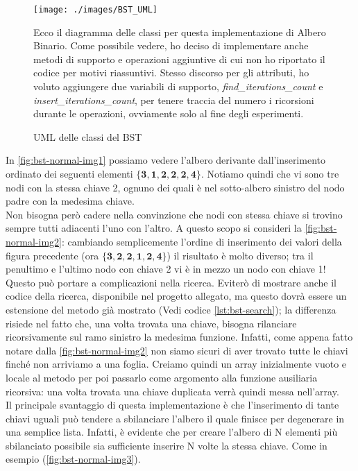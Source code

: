 \documentclass{article}
\begin{document}
\begin{figure}[htbp]
  \begin{minipage}{0.5\textwidth}
    \centering
    \texttt{[image: ./images/BST\_UML]}
    \caption{UML delle classi del BST}
    \label{fig:BST_UML}
  \end{minipage}%
    \hspace{\columnsep}
      \hspace{\columnsep}
  \begin{minipage}{0.5\textwidth}
Ecco il diagramma delle classi per questa implementazione di Albero Binario. Come possibile vedere, ho deciso di implementare anche metodi di supporto e operazioni aggiuntive di cui non ho riportato il codice per motivi riassuntivi.
Stesso discorso per gli attributi, ho voluto aggiungere due variabili di supporto, \textit{find\_iterations\_count} e    \textit{insert\_iterations\_count}, per tenere traccia del numero i ricorsioni durante le operazioni, ovviamente solo al fine degli esperimenti.
  \end{minipage}
\end{figure}




In \cref{fig:bst-normal-img1} possiamo vedere l'albero derivante dall'inserimento ordinato dei seguenti elementi \(\mathbf{\{3, 1, 2, 2, 2, 4\}}\). Notiamo quindi che vi sono tre nodi con la stessa chiave 2, ognuno dei quali è nel sotto-albero sinistro del nodo padre con la medesima chiave.
\\
Non bisogna però cadere nella convinzione che nodi con stessa chiave si trovino sempre tutti adiacenti l'uno con l'altro.
A questo scopo si consideri la \cref{fig:bst-normal-img2}:  cambiando semplicemente l'ordine di inserimento dei valori della figura precedente (ora \(\mathbf{\{3, 2, 2, 1, 2, 4\}}\)) il risultato è molto diverso; tra il penultimo e l'ultimo nodo con chiave 2 vi è in mezzo un nodo con chiave 1!
Questo può portare a complicazioni nella ricerca.
Eviterò di mostrare anche il codice della ricerca, disponibile nel progetto allegato, ma questo dovrà essere un estensione del metodo già mostrato (Vedi codice \ref{lst:bst-search}); la differenza risiede nel fatto che, una volta trovata una chiave, bisogna rilanciare ricorsivamente sul ramo sinistro la medesima funzione. Infatti, come appena fatto notare dalla \cref{fig:bst-normal-img2} non siamo sicuri di aver trovato tutte le chiavi finché non arriviamo a una foglia. Creiamo quindi un array inizialmente vuoto e locale al metodo per poi passarlo come argomento alla funzione ausiliaria ricorsiva: una volta trovata una chiave duplicata verrà quindi messa nell'array. \\
Il principale svantaggio di questa implementazione è che l'inserimento di tante chiavi uguali può tendere a sbilanciare l'albero il quale finisce per degenerare in una semplice lista. Infatti, è evidente che per creare l'albero di N elementi più sbilanciato possibile sia sufficiente inserire N volte la stessa chiave. Come in esempio (\cref{fig:bst-normal-img3}).
\end{document}
